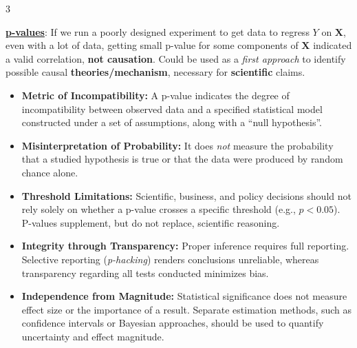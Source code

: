 \documentclass[8pt,a4paper]{extarticle}
\newcommand{\subhdr}[1]{{\bfseries\color{teal!90!black} #1}}
\newcommand{\1}{\mathds{1}}
\begin{document}
\begin{multicols*}{3}
        \begin{flushleft}


        \end{flushleft}



        \underline{\subhdr{p-values}}: If we run a poorly designed experiment to get data to regress $Y$ on $\mathbf{X}$, 
        even with a lot of data, getting small p-value for some components of $\mathbf{X}$ indicated a valid correlation, \textbf{not causation}. 
        Could be used as a \textit{first approach} to identify possible causal \textbf{theories/mechanism}, necessary for \textbf{scientific} claims.

        \begin{itemize}
            \item \textbf{Metric of Incompatibility:} A p-value indicates the degree of incompatibility between observed data and a specified statistical model constructed under a set of assumptions, along with a “null hypothesis”.
            \item \textbf{Misinterpretation of Probability:} It does \textit{not} measure the probability that a studied hypothesis is true or that the data were produced by random chance alone.
            \item \textbf{Threshold Limitations:} Scientific, business, and policy decisions should not rely solely on whether a p-value crosses a specific threshold (e.g., $p < 0.05$). P-values supplement, but do not replace, scientific reasoning.
            \item \textbf{Integrity through Transparency:} Proper inference requires full reporting. Selective reporting (\textit{p-hacking}) renders conclusions unreliable, whereas transparency regarding all tests conducted minimizes bias.
            \item \textbf{Independence from Magnitude:} Statistical significance does not measure effect size or the importance of a result. Separate estimation methods, such as confidence intervals or Bayesian approaches, should be used to quantify uncertainty and effect magnitude.
        \end{itemize}



\end{multicols*}
\end{document}
